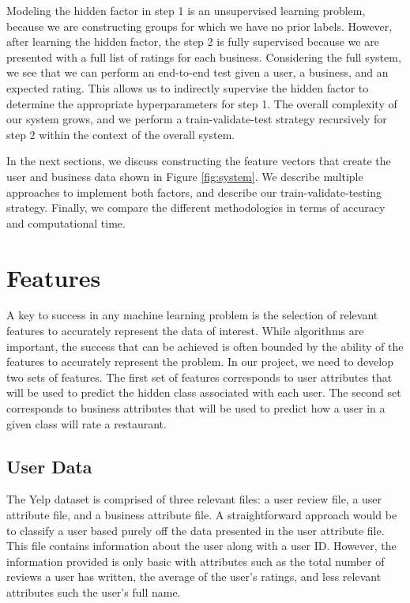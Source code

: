 \documentclass[11pt]{article}
\begin{document}
Modeling the hidden factor in step 1 is an unsupervised learning problem, because we are constructing groups for which we have no prior labels. However, after learning the hidden factor, the step 2 is fully supervised because we are presented with a full list of ratings for each business. Considering the full system, we see that we can perform an end-to-end test given a user, a business, and an expected rating. This allows us to indirectly supervise the hidden factor to determine the appropriate hyperparameters for step 1. The overall complexity of our system grows, and we perform a train-validate-test strategy recursively for step 2 within the context of the overall system.

In the next sections, we discuss constructing the feature vectors that create the user and business data shown in Figure \ref{fig:system}. We describe multiple approaches to implement both factors, and describe our train-validate-testing strategy. Finally, we compare the different methodologies in terms of accuracy and computational time.

\section{Features}

A key to success in any machine learning problem is the selection of relevant features to accurately represent the data of interest. While algorithms are important, the success that can be achieved is often bounded by the ability of the features to accurately represent the problem. In our project, we need to develop two sets of features. The first set of features corresponds to user attributes that will be used to predict the hidden class associated with each user. The second set corresponds to business attributes that will be used to predict how a user in a given class will rate a restaurant.

\subsection{User Data}
The Yelp dataset is comprised of three relevant files: a user review file, a user attribute file, and a business attribute file. A straightforward approach would be to classify a user based purely off the data presented in the user attribute file. This file contains information about the user along with a user ID. However, the information provided is only basic with attributes such as the total number of reviews a user has written, the average of the user's ratings, and less relevant attributes such the user's full name.
\end{document}
